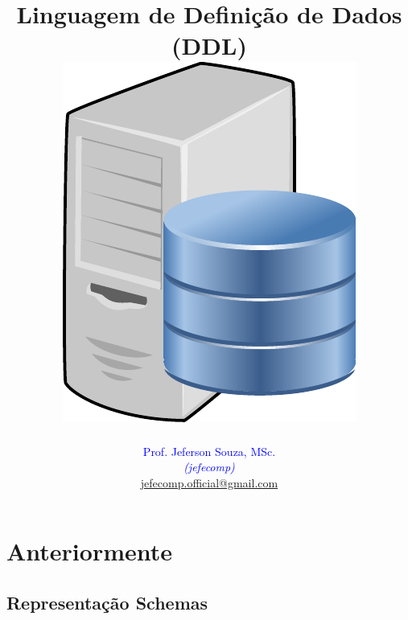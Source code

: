 \documentclass[xcolor=x11names,compress]{beamer}
\begin{document}
\title[Linguagem de Definição de Dados (DDL) \hskip13mm \insertframenumber / \inserttotalframenumber  \hskip33.5mm \inserttitlegraphic]{Linguagem de Definição de Dados (DDL) \\[4mm]
\includegraphics[keepaspectratio,width=.25\textwidth]{database-server}}
\author[@2018 Prof. Jeferson Souza, MSc (jefecomp) - All rights reserved.]{
	\textcolor{blue}{Prof. Jeferson Souza, MSc.} \\[1mm] 
	\textcolor{blue}{\textit{{\footnotesize (jefecomp) }}}\\[1.5mm]
	 \underline{{\footnotesize jefecomp.official@gmail.com}}
	 \vspace*{1mm}
}

\date{}


\begin{frame}
\titlepage
\end{frame}


\section{Anteriormente}
\subsection{Representação Schemas}
\end{document}
